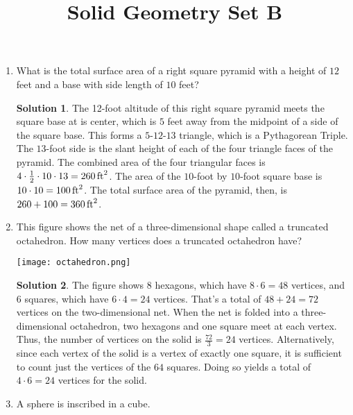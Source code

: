\documentclass{article}
\title{Solid Geometry Set B}
\author{}
\date{}
\theoremstyle{definition}
\newtheorem*{solution}{Solution}
\begin{document}
\maketitle
\begin{multicols}{2}
    \begin{enumerate}
        \item What is the total surface area of a right square pyramid with a height of $12$ feet and a base with side length of $10$ feet?
            \begin{solution}
                The 12-foot altitude of this right square pyramid meets the square base at is center, which is $5$ feet away from the midpoint of a side of the square base.
                This forms a $5$-$12$-$13$ triangle, which is a Pythagorean Triple. The $13$-foot side is the slant height of each of the four triangle faces of the pyramid.
                The combined area of the four triangular faces is $4 \cdot \frac{1}{2} \cdot 10 \cdot 13 = \SI{260}{ft\squared}$.
                The area of the $10$-foot by $10$-foot square base is $10 \cdot 10 = \SI{100}{ft\squared}$.
                The total surface area of the pyramid, then, is $260 + 100 = \SI{360}{ft\squared}$.
            \end{solution}
        \item This figure shows the net of a three-dimensional shape called a truncated octahedron.
            How many vertices does a truncated octahedron have?
            \begin{center}
                \texttt{[image: octahedron.png]}
            \end{center}
            \begin{solution}
                The figure shows $8$ hexagons, which have $8 \cdot 6 = 48$ vertices, and $6$ squares, which have $6 \cdot 4 = 24$ vertices.
                That's a total of $48 + 24 = 72$ vertices on the two-dimensional net.
                When the net is folded into a three-dimensional octahedron, two hexagons and one square meet at each vertex.
                Thus, the number of vertices on the solid is $\frac{72}{3} = 24$ vertices.
                Alternatively, since each vertex of the solid is a vertex of exactly one square, it is sufficient to count just the vertices of the $64$ squares.
                Doing so yields a total of $4 \cdot 6 = 24$ vertices for the solid.
            \end{solution}
        \item A sphere is inscribed in a cube.

\end{enumerate}
\end{multicols}
\end{document}
